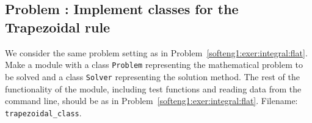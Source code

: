\documentclass[graybox,sectrefs,envcountresetchap,open=right,final]{svmonodo}
\newenvironment{doconceexercise}{}{}
\newcounter{doconceexercisecounter}
\begin{document}
\begin{doconceexercise}

\subsection*{Problem \thedoconceexercisecounter: Implement classes for the Trapezoidal rule}

\label{softeng1:exer:integral:flat2}

We consider the same problem setting as in Problem~\ref{softeng1:exer:integral:flat}. Make a module with a class \texttt{Problem}
representing the mathematical problem to be solved and a class
\texttt{Solver} representing the solution method.  The rest of the
functionality of the module, including test functions and reading data
from the command line, should be as in Problem~\ref{softeng1:exer:integral:flat}.
\noindent Filename: \Verb!trapezoidal_class!.

\end{doconceexercise}
\end{document}
